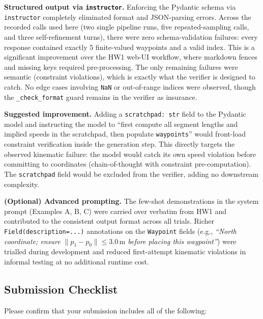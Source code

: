 \documentclass[12pt]{article}
\begin{document}
\medskip
\noindent\textbf{Structured output via \texttt{instructor}.}
Enforcing the Pydantic schema via \texttt{instructor} completely eliminated format and
JSON-parsing errors. Across the recorded calls used here (two single pipeline runs, five
repeated-sampling calls, and three self-refinement turns), there were zero schema-validation
failures: every response contained exactly 5
finite-valued waypoints and a valid index. This is a significant improvement over the HW1
web-UI workflow, where markdown fences and missing keys required pre-processing. The only
remaining failures were semantic (constraint violations), which is exactly what the verifier is
designed to catch. No edge cases involving \texttt{NaN} or out-of-range indices were observed,
though the \texttt{\_check\_format} guard remains in the verifier as insurance.

\medskip
\noindent\textbf{Suggested improvement.}
Adding a \texttt{scratchpad: str} field to the Pydantic model and instructing the model to
``first compute all segment lengths and implied speeds in the scratchpad, then populate
\texttt{waypoints}'' would front-load constraint verification inside the generation step. This
directly targets the observed kinematic failure: the model would catch its own speed violation
before committing to coordinates (chain-of-thought with constraint pre-computation). The
\texttt{scratchpad} field would be excluded from the verifier, adding no downstream complexity.

\medskip
\noindent\textbf{(Optional) Advanced prompting.}
The few-shot demonstrations in the system prompt (Examples A, B, C) were carried over verbatim
from HW1 and contributed to the consistent output format across all trials. Richer
\texttt{Field(description=...)} annotations on the \texttt{Waypoint} fields (e.g.,
\textit{``North coordinate; ensure $\|p_1 - p_0\| \leq 3.0\,\text{m}$ before placing this
waypoint''}) were trialled during development and reduced first-attempt kinematic violations
in informal testing at no additional runtime cost.

\newpage
\subsection*{Submission Checklist}

Please confirm that your submission includes all of the following:
\end{document}

